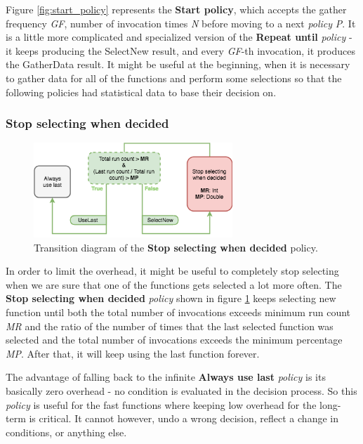 Figure \ref{fig:start_policy} represents the \textbf{Start policy}, which accepts the gather frequency \textit{GF}, number of invocation times \textit{N} before moving to a next \textit{policy} \textit{P}. It is a little more complicated and specialized version of the \textbf{Repeat until} \textit{policy} - it keeps producing the SelectNew result, and every \textit{GF}-th invocation, it produces the GatherData result. It might be useful at the beginning, when it is necessary to gather data for all of the functions and perform some selections so that the following policies had statistical data to base their decision on.

\subsubsection{Stop selecting when decided}

\begin{figure}[h!]
	\captionsetup{justification=centering,margin=0.5cm}
	\centerline{\mbox{\includegraphics[width=75mm]{./img/stop_selecting_when_decided.png}}}
	\caption{Transition diagram of the \textbf{Stop selecting  when decided} policy.}
	\label{fig:stop_selecting_when_decided}
\end{figure}

In order to limit the overhead, it might be useful to completely stop selecting when we are sure that one of the functions gets selected a lot more often. The \textbf{Stop selecting when decided} \textit{policy} shown in figure \ref{fig:stop_selecting_when_decided} keeps selecting new function until both the total number of invocations exceeds minimum run count \textit{MR} and the ratio of the number of times that the last selected function was selected and the total number of invocations exceeds the minimum percentage \textit{MP}. After that, it will keep using the last function forever. 

The advantage of falling back to the infinite \textbf{Always use last} \textit{policy} is its basically zero overhead - no condition is evaluated in the decision process. So this \textit{policy} is useful for the fast functions where keeping low overhead for the long-term is critical. It cannot however, undo a wrong decision, reflect a change in conditions, or anything else.


